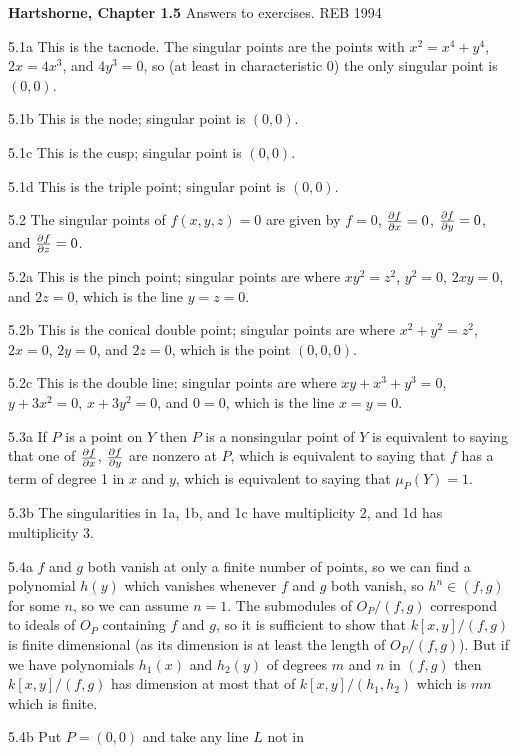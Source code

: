 \def\Z{{\bf Z}}
{\bf Hartshorne, Chapter 1.5}
Answers to exercises. \hfill REB 1994
\item{5.1a} This is the tacnode. The singular points
are the points with $x^2=x^4+y^4$, $2x=4x^3$, and $4y^3=0$,
so (at least in characteristic 0) the only singular point is
$(0,0)$.
\item{5.1b} This is the node; singular point is $(0,0)$. 
\item{5.1c} This is the cusp; singular point is $(0,0)$. 
\item{5.1d} This is the triple point; singular point is $(0,0)$. 
\item{5.2} The singular points of $f(x,y,z)=0$ are
given by $f=0$, ${\partial f\over \partial x}=0$,
${\partial f\over \partial y}=0$, and ${\partial f\over \partial z}=0$.
\item{5.2a} This is the pinch point; singular points
are where $xy^2=z^2$, $y^2=0$, $2xy=0$, and $2z=0$,
which is the line $y=z=0$. 
\item{5.2b} This is the conical double point; singular points
are where $x^2+y^2=z^2$, $2x=0$, $2y=0$, and $2z=0$,
which is the point $(0,0,0)$. 
\item{5.2c} This is the double line; singular points
are where $xy+x^3+y^3=0$, $y+3x^2=0$, $x+3y^2=0$, and $0=0$,
which is the line $x=y=0$. 
\item{5.3a} If $P$ is a point on $Y$ then $P$
 is a nonsingular point of $Y$ is equivalent to saying that one of
${\partial f\over \partial x}$, ${\partial f\over
\partial y}$ are nonzero at $P$, which is equivalent to saying that
$f$ has a term of degree 1 in $x$ and $y$, which is equivalent to
saying that $\mu_P(Y)=1$.
\item{5.3b} The singularities in 1a, 1b, and 1c have multiplicity 2,
and 1d has multiplicity 3. 
\item{5.4a}  $f$ and $g$ both vanish at only a finite number of points,
so we can find a polynomial $h(y)$ which 
vanishes whenever $f$ and $g$ both vanish, so $h^n\in (f,g)$
for some $n$, so we can assume $n=1$. The submodules of 
$O_P/(f,g)$ correspond to ideals of $O_P$ containing 
$f$ and $g$, so it is sufficient to show that
$k[x,y]/(f,g)$ is finite dimensional (as its dimension
is at least the length of $O_P/(f,g)$). But if we have
polynomials $h_1(x)$ and $h_2(y)$ of degrees $m$ and $n$
in $(f,g)$ then $k[x,y]/(f,g)$ has dimension at most that
of $k[x,y]/(h_1,h_2)$ which is $mn$ which is finite. 
\item{5.4b} Put $P=(0,0)$ and take any line $L$ not in
